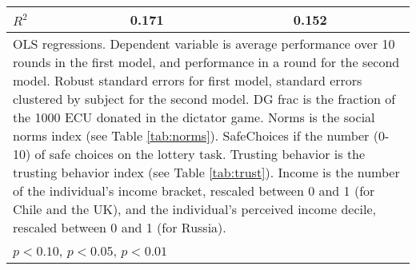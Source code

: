 {\begin{tabular}{p{10cm}*{2}{cc}}
\(R^{2}\)       &    0.171         &         &    0.152         &         \\
\hline\hline
\multicolumn{5}{p{17cm}}{\tiny OLS regressions. Dependent variable is average performance over 10 rounds in the first model, and performance in a round for the second model. Robust standard errors for first model, standard errors clustered by subject for the second model. DG frac is the fraction of the 1000 ECU donated in the dictator game. Norms is the social norms index (see Table \ref{tab:norms}). SafeChoices if the number (0-10) of safe choices on the lottery task. Trusting behavior is the trusting behavior index (see Table \ref{tab:trust}). Income is the number of the individual's income bracket, rescaled between 0 and 1 (for Chile and the UK), and the individual's perceived income decile, rescaled between 0 and 1 (for Russia).}\\
\multicolumn{5}{l}{\footnotesize \sym{*} \(p<0.10\), \sym{**} \(p<0.05\), \sym{***} \(p<0.01\)}\\
\end{tabular}
}

